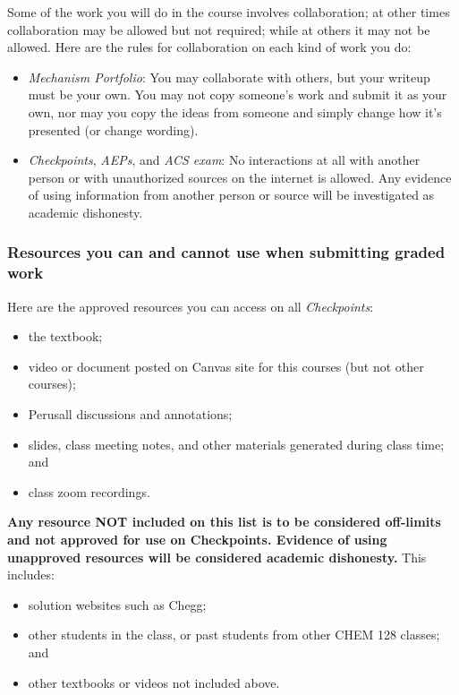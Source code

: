 Some of the work you will do in the course involves collaboration; at
other times collaboration may be allowed but not required; while at
others it may not be allowed. Here are the rules for collaboration on
each kind of work you do:

\begin{itemize}
\tightlist
\item
  \emph{Mechanism Portfolio}: You may collaborate with others, but your
  writeup must be your own. You may not copy someone's work and submit
  it as your own, nor may you copy the ideas from someone and simply
  change how it's presented (or change wording).
\item
  \emph{Checkpoints}, \emph{AEPs}, and \emph{ACS exam}: No interactions
  at all with another person or with unauthorized sources on the
  internet is allowed. Any evidence of using information from another
  person or source will be investigated as academic dishonesty.
\end{itemize}

\hypertarget{resources-you-can-and-cannot-use-when-submitting-graded-work}{%
\subsubsection{Resources you can and cannot use when submitting graded
work}\label{resources-you-can-and-cannot-use-when-submitting-graded-work}}

Here are the approved resources you can access on all
\emph{Checkpoints}:

\begin{itemize}
\tightlist
\item
  the textbook;
\item
  video or document posted on Canvas site for this courses (but not
  other courses);
\item
  Perusall discussions and annotations;
\item
  slides, class meeting notes, and other materials generated during
  class time; and
\item
  class zoom recordings.
\end{itemize}

\textbf{Any resource NOT included on this list is to be considered
off-limits and not approved for use on Checkpoints. Evidence of using
unapproved resources will be considered academic dishonesty.} This
includes:

\begin{itemize}
\tightlist
\item
  solution websites such as Chegg;
\item
  other students in the class, or past students from other CHEM 128
  classes; and
\item
  other textbooks or videos not included above.
\end{itemize}

